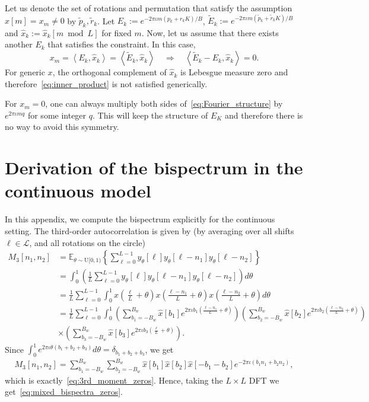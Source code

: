 \documentclass[english,12pt]{article}
\newcommand{\I}{\iota}
\newcommand{\tB}{B_w}
\newcommand{\hx}{\hat{x}}
\newcommand{\E}{\mathbb{E}}
\numberwithin{equation}{section}
\numberwithin{thm}{section} %
\begin{document}
Let us denote the set of rotations and permutation that satisfy the assumption  $\hx[m]=x_m\neq 0$ by $\tilde{p}_k,\tilde{r}_k$. Let $E_k:=e^{-2\pi\I m( p_k+r_k K)/B}$, $\tilde{E}_k:=e^{-2\pi\I m( \tilde{p}_k+\tilde{r}_k K)/B}$ and $\hx_k:=\hat{x}_k[m \bmod L]$ for fixed $m$. Now, let us assume that there exists another $E_k$ that satisfies the constraint. In this case,
\begin{equation} \label{eq:inner_product}
x_m=\left\langle E_k,\hx_k\right\rangle = \left\langle \tilde{E}_k,\hx_k\right\rangle \quad \Rightarrow \quad\left\langle \tilde{E}_k -{E}_k,\hx_k\right\rangle =0.
\end{equation} 
For generic $x$, the orthogonal complement of $\hx_k$ is Lebesgue measure zero and therefore~\eqref{eq:inner_product} is not satisfied generically.  

For $x_m=0$, one can always multiply both sides of~\eqref{eq:Fourier_structure} by $e^{2\pi\I m q }$ for some integer $q$. This will keep the structure of $E_K$ and therefore there is no way to avoid this symmetry. 

\section{Derivation of the bispectrum in the continuous model} \label{sec:continuous_bispectrum}

In this appendix, we compute the bispectrum explicitly for the continuous setting. The third-order autocorrelation is given by (by averaging over all shifts $\ell\in\mathcal{L}$, and all rotations on the circle)
\begin{equation}
\begin{split}
M_3[n_1,n_2] &= \E_{\theta\sim\text{U}[0,1)}\left\{ \sum_{\ell=0}^{L-1}  y_\theta[\ell] y_\theta[\ell-n_1] y_\theta[\ell-n_2]\right\} 
\\&=\int_{0}^{1}\left(\frac{1}{L}\sum_{\ell=0}^{L-1} y_\theta[\ell] y_\theta[\ell-n_1] y_\theta[\ell-n_2]\right)d\theta\\ 
&= \frac{1}{L}\sum_{\ell=0}^{L-1}\int_{0}^{1} x\left(\frac{\ell}{L} + \theta\right) x\left(\frac{\ell-n_1}{L} + \theta\right)
x\left(\frac{\ell-n_2}{L} + \theta\right)d\theta\\
&= \frac{1}{L}\sum_{\ell=0}^{L-1}\int_{0}^{1} 
\left(\sum_{b_1=-\tB}^{\tB}\hat{x}[b_1]e^{2\pi\I b_1 \left(\frac{\ell-n_1}{L} + \theta\right) }\right) 
\left(\sum_{b_2=-\tB}^{\tB}\hat{x}[b_2]e^{2\pi\I b_2 \left(\frac{\ell-n_2}{L} + \theta\right) } \right) \\
&\times \left(\sum_{b_3=-\tB}^{\tB}\hat{x}[b_3]e^{2\pi\I b_3 \left(\frac{\ell}{L} + \theta\right) }\right). 
\end{split}
\end{equation}
Since $\int_{0}^{1}e^{2\pi\I\theta(b_1+b_2+b_3)}d\theta=\delta_{b_1+b_2+b_3}$, we get 
\begin{equation}
\begin{split}
M_3[n_1,n_2] =   \sum_{b_1=-\tB}^{\tB}\sum_{b_2=-\tB}^{\tB} \hat{x}[b_1]\hat{x}[b_2]\hat{x}[-b_1-b_2]e^{-2\pi\I (b_1n_1+b_2n_2)},
\end{split}
\end{equation}
which is exactly~\eqref{eq:3rd_moment_zeros}. Hence, taking the $L\times L$ DFT we get~\eqref{eq:mixed_bispectra_zeros}.
\end{document}
